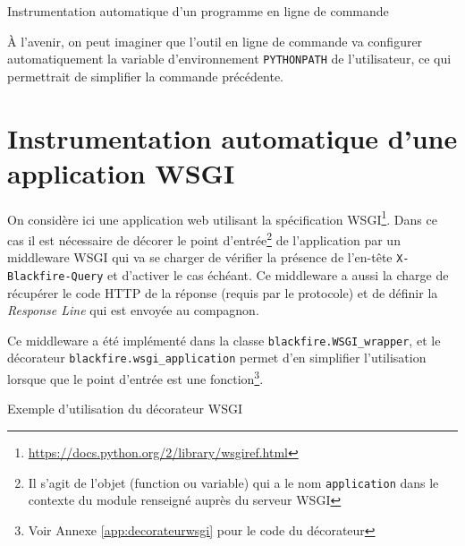 \begin{listing}[H]
\caption{Instrumentation automatique d'un programme en ligne de commande}
\end{listing}

\begin{note}
À l'avenir, on peut imaginer que l'outil en ligne de commande \Blackfire va configurer automatiquement la variable d'environnement \verb|PYTHONPATH| de l'utilisateur, ce qui permettrait de simplifier la commande précédente.
\end{note}

\section[Application WSGI]{Instrumentation automatique d'une application WSGI}
On considère ici une application web utilisant la spécification WSGI\footnote{\url{https://docs.python.org/2/library/wsgiref.html}}. Dans ce cas il est nécessaire de décorer le point d'entrée\footnote{Il s'agit de l'objet (function ou variable) qui a le nom \verb|application| dans le contexte du module renseigné auprès du serveur WSGI} de l'application par un middleware WSGI qui va se charger de vérifier la présence de l'en-tête \verb|X-Blackfire-Query| et d'activer \Blackfire le cas échéant. Ce middleware a aussi la charge de récupérer le code HTTP de la réponse (requis par le protocole) et de définir la \emph{Response Line} qui est envoyée au compagnon.

Ce middleware a été implémenté dans la classe \verb|blackfire.WSGI_wrapper|, et le décorateur \verb|blackfire.wsgi_application| permet d'en simplifier l'utilisation lorsque que le point d'entrée est une fonction\footnote{Voir Annexe \vref{app:decorateurwsgi} pour le code du décorateur}.

\begin{listing}[H]
\caption{Exemple d'utilisation du décorateur WSGI}
\end{listing}



